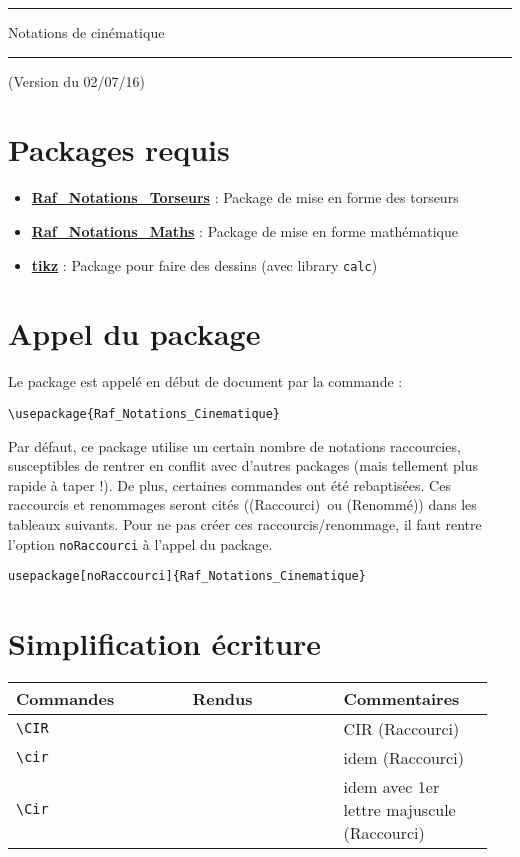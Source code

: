 \documentclass[a4paper,10pt]{article}
\newcommand{\rac}{({\color{red}Raccourci})}
\newcommand{\ren}{({\color{blue}Renommé})}
\begin{document}
	\begin{center}
		\hrule{\Large Notations de cinématique}\\\hrule
	\end{center}

	(Version du 02/07/16)

	\section{Packages requis}

		\begin{itemize}
			\item \href{http://enseignement.allais.eu/page-latex}{\textbf{Raf\_Notations\_Torseurs}} : Package de mise en forme des torseurs
			\item \href{http://enseignement.allais.eu/page-latex}{\textbf{Raf\_Notations\_Maths}} : Package de mise en forme mathématique
			\item \href{http://www.ctan.org/pkg/pgf}{\textbf{tikz}} : Package pour faire des dessins (avec library \verb!calc!)
		\end{itemize}

	\section{Appel du package}

		Le package est appelé en début de document par la commande :
		\begin{verbatim}
\usepackage{Raf_Notations_Cinematique}
		\end{verbatim}

	Par défaut, ce package utilise un certain nombre de notations raccourcies, susceptibles de rentrer en conflit avec d'autres packages (mais tellement plus rapide à taper !).
	De plus, certaines commandes ont été rebaptisées.
	Ces raccourcis et renommages seront cités (\rac\ ou \ren) dans les tableaux suivants.
	Pour ne pas créer ces raccourcis/renommage, il faut rentre l'option \verb!noRaccourci! à l'appel du package.

	\begin{verbatim}
usepackage[noRaccourci]{Raf_Notations_Cinematique}
	\end{verbatim}


	\section{Simplification écriture}
	\noindent
	\begin{tabular}{|p{0.35\linewidth}|p{0.3\linewidth}|p{0.3\linewidth}|}
		\hline
			\textbf{Commandes}&\textbf{Rendus}&\textbf{Commentaires}
		\\\hline\hline
			\verb!\CIR!			&	\CIR			&	CIR \rac
		\\\hline
			\verb!\cir!		&	\cir		&	idem \rac
		\\\hline
			\verb!\Cir!			&	\Cir			&	idem avec 1er lettre majuscule \rac
		\\\hline
	\end{tabular}
\end{document}
